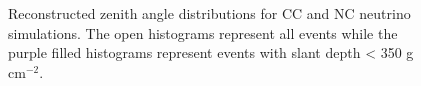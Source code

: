 \begin{figure}[h!]
  \centering
  \hfill
  \caption{Reconstructed zenith angle distributions for CC and NC neutrino simulations. The open histograms represent all events while the purple filled histograms represent events with slant depth < 350 g cm$^{-2}$.}
  \label{fig:Rec_Theta}
\end{figure}

